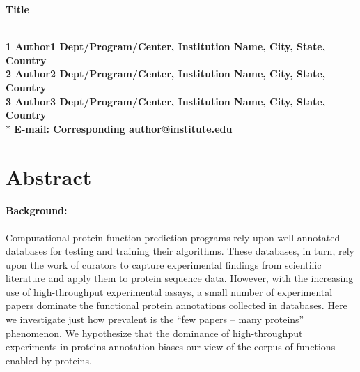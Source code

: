 \documentclass[10pt]{article}
\date{}
\begin{document}
\begin{flushleft}
{\Large
\textbf{Title}
}
\\
\author{Alexandra Schnoes$^1$%
      \and
         Alexander Thorman$^2$%
       and 
        Iddo Friedberg\correspondingauthor$^{2,3}$%
      }
      

\address{%
    \iid(1)Department of Bioengineering and Therapeutic Sciences, University of California San Francisco, San Francisco, CA, USA\\
    \iid(2)Department of Microbiology, Miami University, Oxford, OH USA\\
    \iid(3)Department of Computer Science and Software Engineering , Miami University, Oxford, OH USA
}%
\\
\bf{1} Author1 Dept/Program/Center, Institution Name, City, State, Country
\\
\bf{2} Author2 Dept/Program/Center, Institution Name, City, State, Country
\\
\bf{3} Author3 Dept/Program/Center, Institution Name, City, State, Country
\\
$\ast$ E-mail: Corresponding author@institute.edu
\end{flushleft}

\section*{Abstract}

        \paragraph*{Background:} Computational protein function
prediction programs rely upon well-annotated databases for testing and training
their algorithms. These databases, in turn, rely upon the work of curators
to capture experimental findings from scientific literature and apply them to protein
sequence data. However, with the increasing use of high-throughput experimental
assays,  a small number of experimental papers dominate
the functional protein annotations collected in databases. 
Here we investigate just how prevalent is the ``few papers --
many proteins'' phenomenon. We hypothesize that the dominance of high-throughput experiments in
proteins annotation biases our view of the corpus of functions enabled by proteins.
      
\end{document}
